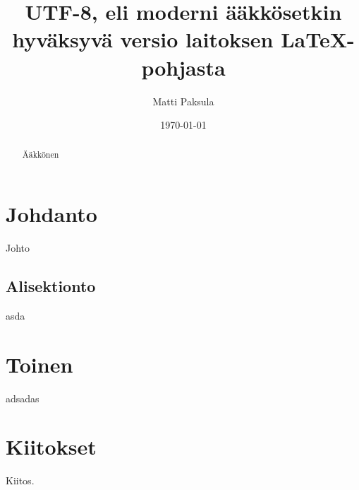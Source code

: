 \documentclass{tktltiki}
\begin{document}
\title{UTF-8, eli moderni ääkkösetkin hyväksyvä versio laitoksen LaTeX-pohjasta}
\author{Matti Paksula}
\date{\today}
\maketitle

\onehalfspacing

\subject{Tietojenksittelytiede}


\begin{abstract}
	Ääkkönen
\end{abstract}

\setcounter{tocdepth}{3}
\mytableofcontents



\section{Johdanto}
 
Johto \cite{Spinellis}

\subsection{Alisektionto}
asda

\section{Toinen}
adsadas

\section*{Kiitokset}

Kiitos.




\lastpage
\end{document}
